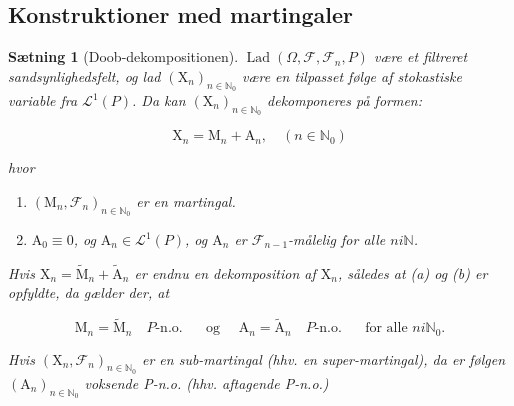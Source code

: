 \documentclass{article}
\newcommand{\1}{\mathbbm{1}}
\theoremstyle{boxed}
\newtheorem{proposition}[theorem]{Sætning}
\begin{document}
\subsection{Konstruktioner med martingaler}
\begin{theorem-box}
    \begin{proposition}[Doob-dekompositionen]
        $\operatorname{Lad}\left(\Omega, \mathcal{F}, \mathcal{F}_n, P\right)$ være et filtreret sandsynlighedsfelt, og lad $\left(\mathrm{X}_n\right)_{n \in \mathbb{N}_0}$ være en tilpasset følge af stokastiske variable fra $\mathcal{L}^1(P)$.
Da kan $\left(\mathrm{X}_n\right)_{n \in \mathbb{N}_0}$ dekomponeres på formen:

$$
\mathrm{X}_n=\mathrm{M}_n+\mathrm{A}_n, \quad\left(n \in \mathbb{N}_0\right)
$$

hvor
\begin{enumerate}
    \item  $\left(\mathrm{M}_n, \mathcal{F}_n\right)_{n \in \mathbb{N}_0}$ er en martingal.
    \item $\mathrm{A}_0 \equiv 0$, og $\mathrm{A}_n \in \mathcal{L}^1(P)$, og $\mathrm{A}_n$ er $\mathcal{F}_{n-1}$-målelig for alle $n i \mathbb{N}$.
\end{enumerate}

Hvis $\mathrm{X}_n=\tilde{\mathrm{M}}_n+\tilde{\mathrm{A}}_n$ er endnu en dekomposition af $\mathrm{X}_n$, således at (a) og (b) er opfyldte, da gælder der, at

$$
\mathrm{M}_n=\tilde{\mathrm{M}}_n \quad P \text {-n.o. } \quad \text { og } \quad \mathrm{A}_n=\tilde{\mathrm{A}}_n \quad P \text {-n.o. } \quad \text { for alle } n i \mathbb{N}_0 .
$$


Hvis $\left(\mathrm{X}_n, \mathcal{F}_n\right)_{n \in \mathbb{N}_0}$ er en sub-martingal (hhv. en super-martingal), da er følgen $\left(\mathrm{A}_n\right)_{n \in \mathbb{N}_0}$ voksende P-n.o. (hhv. aftagende P-n.o.)
    \end{proposition}
\end{theorem-box}
\end{document}
